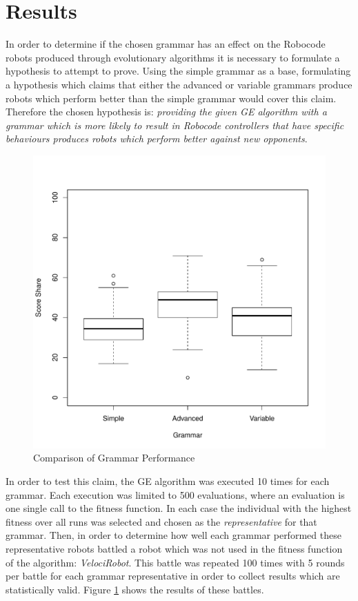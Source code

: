 \documentclass[a4paper, 12pt]{article}
\begin{document}
\section{Results}
In order to determine if the chosen grammar has an effect on the Robocode robots produced through evolutionary algorithms it is necessary to formulate a hypothesis to attempt to prove. Using the simple grammar as a base, formulating a hypothesis which claims that either the advanced or variable grammars produce robots which perform better than the simple grammar would cover this claim. Therefore the chosen hypothesis is: \textit{providing the given GE algorithm with a grammar which is more likely to result in Robocode controllers that have specific behaviours produces robots which perform better against new opponents}.
\begin{figure}[!t]
\centering
\includegraphics[width=4.5in]{figures/grammar_comparison.pdf}
\caption{Comparison of Grammar Performance}
\label{comp_plots}
\end{figure}
In order to test this claim, the GE algorithm was executed 10 times for each grammar. Each execution was limited to 500 evaluations, where an evaluation is one single call to the fitness function. In each case the individual with the highest fitness over all runs was selected and chosen as the \textit{representative} for that grammar. Then, in order to determine how well each grammar performed these representative robots battled a robot which was not used in the fitness function of the algorithm: \textit{VelociRobot}. This battle was repeated 100 times with 5 rounds per battle for each grammar representative in order to collect results which are statistically valid. Figure \ref{comp_plots} shows the results of these battles. 
\end{document}
